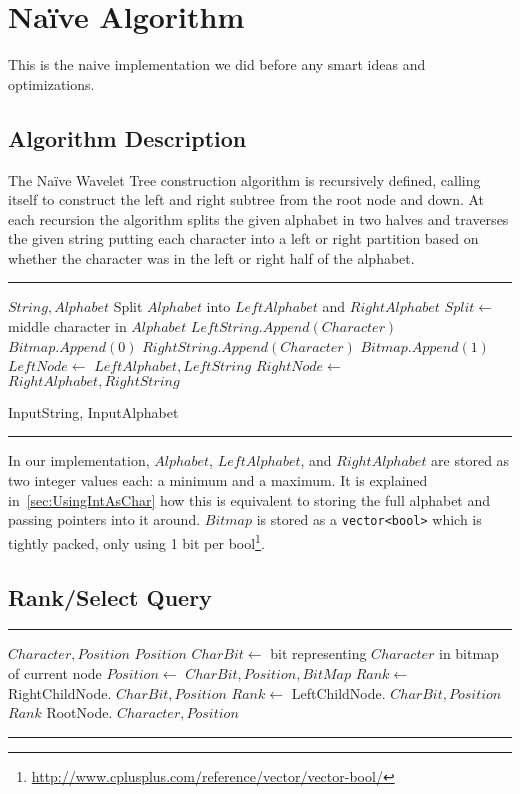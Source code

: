 \section{Naïve Algorithm}
This is the naive implementation we did before any smart ideas and optimizations.
\subsection{Algorithm Description}
The Naïve Wavelet Tree construction algorithm is recursively defined, calling itself to construct the left and right subtree from the root node and down. At each recursion the algorithm splits the given alphabet in two halves and traverses the given string putting each character into a left or right partition based on whether the character was in the left or right half of the alphabet.

\noindent\rule{\textwidth}{0.5pt}
\begin{algorithmic}
 {$String, Alphabet$}
	\State \Return
\EndIf
\State Split $Alphabet$ into $LeftAlphabet$ and $RightAlphabet$
\State $Split \gets$ middle character in $Alphabet$
		\State $LeftString.Append(Character)$
		\State $Bitmap.Append(0)$
	\Else
		\State $RightString.Append(Character)$
		\State $Bitmap.Append(1)$
	\EndIf
\EndFor
\State $LeftNode \gets$  {$LeftAlphabet, LeftString$}
\State $RightNode \gets$  {$RightAlphabet, RightString$}
\EndFunction

\State {} {InputString, InputAlphabet}
\end{algorithmic}
\noindent\rule{\textwidth}{0.5pt}
\linebreak

\noindent In our implementation, $Alphabet$, $LeftAlphabet$, and $RightAlphabet$ are stored as two integer values each: a minimum and a maximum. It is explained in~\ref{sec:UsingIntAsChar} how this is equivalent to storing the full alphabet and passing pointers into it around. $Bitmap$ is stored as a \texttt{vector<bool>} which is tightly packed, only using 1 bit per bool\footnote{\url{http://www.cplusplus.com/reference/vector/vector-bool/}}.

\subsection{Rank/Select Query}
\noindent\rule{\textwidth}{0.5pt}
\begin{algorithmic} 
 {$Character, Position$}
\State \Return $Position$
\EndIf
\State $CharBit \gets$ bit representing $Character$ in bitmap of current node
\State $Position \gets$  {$CharBit, Position, BitMap$}
	\State $Rank \gets$ RightChildNode. {$CharBit, Position$}
\Else
	\State $Rank \gets$ LeftChildNode. {$CharBit, Position$}
\EndIf
\State \Return $Rank$ 
\EndFunction
\State RootNode. {$Character, Position$}
\end{algorithmic}
\noindent\rule{\textwidth}{0.5pt}
\linebreak

